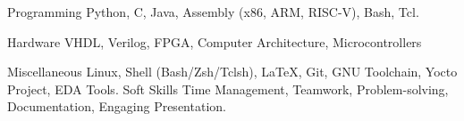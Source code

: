 

\begin{cvskills}

  \cvskill
    {Programming} %
    {Python, C, Java, Assembly (x86, ARM, RISC-V), Bash, Tcl.} %
    
  \cvskill
    {Hardware} %
    {VHDL, Verilog, FPGA, Computer Architecture, Microcontrollers} %

  \cvskill
    {Miscellaneous} %
    {Linux, Shell (Bash/Zsh/Tclsh), \LaTeX, Git, GNU Toolchain, Yocto Project, EDA Tools.} %
  \cvskill
    {Soft Skills} %
    {Time Management, Teamwork, Problem-solving, Documentation, Engaging Presentation.} %

\end{cvskills}
